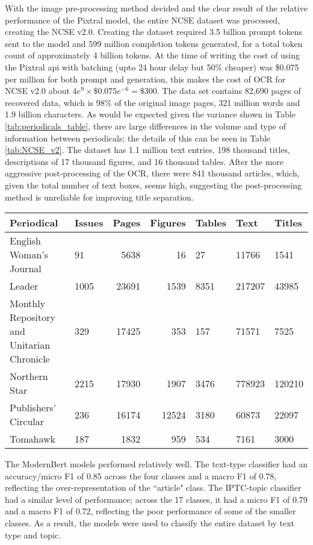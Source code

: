 \documentclass{article} %
\begin{document}
With the image pre-processing method decided and the clear result of the relative performance of the Pixtral model, the entire NCSE dataset was processed, creating the NCSE v2.0. Creating the dataset required 3.5 billion prompt tokens sent to the model and 599 million completion tokens generated, for a total token count of approximately 4 billion tokens. At the time of writing the cost of using the Pixtral api with batching (upto 24 hour delay but 50\% cheaper) was \$0.075 per million for both prompt and generation, this makes the cost of OCR for NCSE v2.0 about $4e^9 \times \$0.075e^{-6}= \$300$. The data set contains 82,690 pages of recovered data, which is 98\% of the original image pages, 321 million words and 1.9 billion characters. As would be expected given the variance shown in Table \ref{tab:periodicals_table}, there are large differences in the volume and type of information between periodicals; the details of this can be seen in Table \ref{tab:NCSE_v2}. The dataset has 1.1 million text entries, 198 thousand titles, descriptions of 17 thousand figures, and 16 thousand tables. After the more aggressive post-processing of the OCR, there were 841 thousand articles, which, given the total number of text boxes, seems high, suggesting the post-processing method is unreliable for improving title separation.

\begin{table*}
\caption{Key information on the NCSE v2.0 dataset}
\label{tab:NCSE_v2}
\begin{tabular}{p{4cm}lrrp{1cm}p{1cm}p{1cm}}
\toprule
Periodical & Issues & Pages & Figures & Tables & Text & Titles \\
\midrule
English Woman’s Journal & 91 & 5638 & 16 & 27 & 11766 & 1541 \\
Leader & 1005 & 23691 & 1539 & 8351 & 217207 & 43985 \\
Monthly Repository and Unitarian Chronicle & 329 & 17425 & 353 & 157 & 71571 & 7525 \\
Northern Star & 2215 & 17930 & 1907 & 3476 & 778923 & 120210 \\
Publishers’ Circular & 236 & 16174 & 12524 & 3180 & 60873 & 22097 \\
Tomahawk & 187 & 1832 & 959 & 534 & 7161 & 3000 \\
\bottomrule
\end{tabular}
\end{table*}

The ModernBert models performed relatively well. The text-type classifier had an accuracy/micro F1 of 0.85 across the four classes and a macro F1 of 0.78, reflecting the over-representation of the ``article" class. The IPTC-topic classifier had a similar level of performance; across the 17 classes, it had a micro F1 of 0.79 and a macro F1 of 0.72, reflecting the poor performance of some of the smaller classes. As a result, the models were used to classify the entire dataset by text type and topic.
\end{document}
